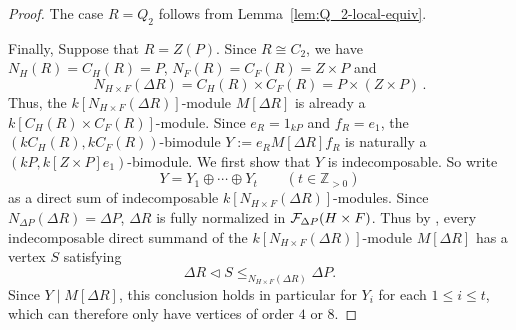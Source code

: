 \begin{proof}
\medskip
{} The case $R=Q_2$ follows from Lemma~\ref{lem:Q_2-local-equiv}.

\medskip
{} Finally, Suppose that $R=Z(P)$. Since $R\cong C_2$, we have $N_H(R)=C_H(R)=P$, $N_F(R)=C_F(R)=Z\times P$ and
\[
N_{H\times F}(\Delta R)=C_H(R)\times C_F(R)=P\times (Z\times P)\,.
\]
Thus, the $k[N_{H\times F}(\Delta R)]$-module $M[\Delta R]$ is already a $k[C_H(R)\times C_F(R)]$-module. Since $e_R=1_{kP}$ and $f_R=e_1$, the  $(kC_H(R),kC_F(R))$-bimodule $Y:=e_RM[\Delta R]f_R$ is naturally a $(kP,k[Z\times P]e_1)$-bimodule. We first show that $Y$ is indecomposable. So write 
\[
Y=Y_1\oplus\cdots\oplus Y_t\qquad (t\in\mathbb{Z}_{>0})
\]
as a direct sum of indecomposable $k[N_{H\times F}(\Delta R)]$-modules. Since $N_{\Delta P}(\Delta R)=\Delta P$, $\Delta R$ is fully normalized in $\mathcal{F}_{\Delta P}(H\times F)$. Thus by \cite[Lemma~6.4]{KunugiSuzuki}, every indecomposable direct summand of the $k[N_{H\times F}(\Delta R)]$-module $M[\Delta R]$ has a vertex $S$ satisfying
\begin{equation}\label{eq:vertices-ZP}
\Delta R\lhd S\le_{N_{H\times F}(\Delta R)}\Delta P.
\end{equation}
Since $Y\mid M[\Delta R]$, this conclusion holds in particular for $Y_i$ for each $1\le i\le t$, which can therefore only have vertices of order $4$ or $8$.


\end{proof}
